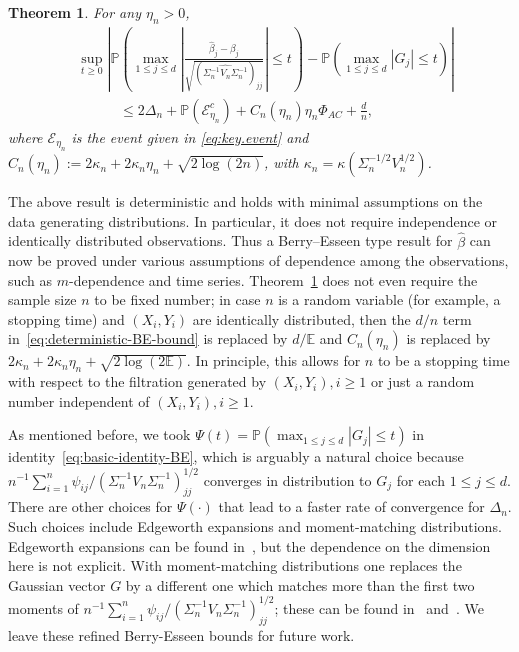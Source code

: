 \documentclass{article}
\newtheorem{theorem}{Theorem}
\begin{document}
 
 
 \begin{theorem}\label{thm:Berry-Esseen-OLS}
 For any $\eta_n > 0$,
 \begin{equation}\label{eq:deterministic-BE-bound}
 \begin{split}
 &\sup_{t\ge0}\left|\mathbb{P}\left(\max_{1\le j\le d}\left|\frac{\widehat{\beta}_j - \beta_j}{\sqrt{(\widehat{\Sigma_n^{-1}V_n\Sigma_n^{-1}})_{jj}}}\right| \le t\right) - \mathbb{P}\left(\max_{1\le j\le d}|G_j| \le t\right)\right|
 \\ 
 &\quad\qquad
 \le 2\Delta_n + \mathbb{P}(\mathcal{E}_{\eta_n}^c) + C_n(\eta_n)\eta_n\Phi_{AC} + \frac{d}{n},
 \end{split}
 \end{equation}
 where $\mathcal{E}_{\eta_n}$ is the event given in \eqref{eq:key.event} and $C_n(\eta_n) := 2 \kappa_n + 2 \kappa_n \eta_n + \sqrt{2\log(2  n)}$, with $\kappa_n = \kappa(\Sigma_n^{-1/2}V_n^{1/2}) $.
 \end{theorem}
 
 
 The above result is deterministic and holds with minimal assumptions on the data generating distributions. In particular, it does not require independence or identically distributed observations. Thus a Berry--Esseen type result for $\widehat{\beta}$ can now be proved under various assumptions of dependence among the observations, such as $m$-dependence and time series. Theorem~\ref{thm:Berry-Esseen-OLS} does not even require the sample size $n$ to be fixed number; in case $n$ is a random variable (for example, a stopping time) and $(X_i, Y_i)$ are identically distributed, then the $d/n$ term in~\eqref{eq:deterministic-BE-bound} is replaced by $d/\mathbb{E}$ and $C_n(\eta_n)$ is replaced by $2\kappa_n + 2\kappa_n\eta_n + \sqrt{2\log(2\mathbb{E})}$. In principle, this allows for $n$ to be a stopping time with respect to the filtration generated by $(X_i, Y_i), i\ge1$ or just a random number independent of $(X_i, Y_i), i\ge1$.
 
 As mentioned before, we took $\Psi(t) = \mathbb{P}(\max_{1\le j\le d}|G_j| \le t)$ in identity~\eqref{eq:basic-identity-BE}, which is arguably a natural choice because $n^{-1}\sum_{i=1}^n \psi_{ij}/(\Sigma_n^{-1}V_n\Sigma_n^{-1})_{jj}^{1/2}$ converges in distribution to $G_j$ for each $1\le j\le d$. There are other choices for $\Psi(\cdot)$ that lead to a faster rate of convergence for $\Delta_n$. Such choices include Edgeworth expansions and moment-matching distributions. Edgeworth expansions can be found in~\citet{bhattacharya2010normal}, but the dependence on the dimension here is not explicit. With moment-matching distributions one replaces the Gaussian vector $G$ by a different one which matches more than the first two moments of $n^{-1}\sum_{i=1}^n \psi_{ij}/(\Sigma_n^{-1}V_n\Sigma_n^{-1})_{jj}^{1/2}$; these can be found in~\cite{boutsikas2015penultimate} and~\cite{zhilova2016non}. We leave these refined Berry-Esseen bounds for future work.
 
\end{document}
